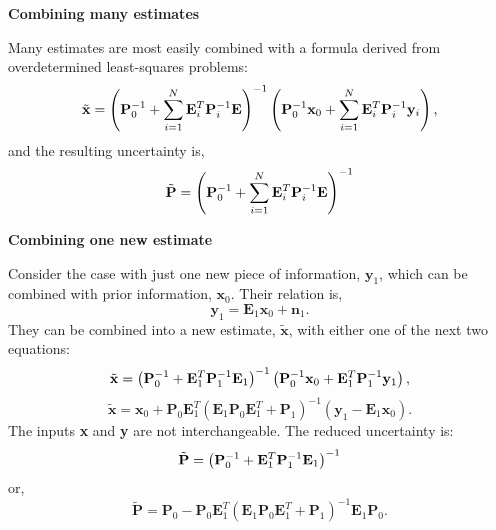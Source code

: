 \documentclass{article}
\begin{document}
\textbf{{Combining many estimates}}

Many estimates are most easily combined with a formula derived from overdetermined least-squares problems:
\begin{equation}
\label{eq:18}
\tilde{\mathbf{x}} = \left({\bf P}^{-1}_0 + \sum_{i=1}^{N} {\bf E}^T_i {\bf P}_i^{-1} {\bf E} \right)^{-1} \left( {\bf P}_0^{-1} {\bf x}_{0} +  \sum_{i=1}^{N} {\bf E}^T_i {\bf P}_i^{-1} {\bf y}_{i} \right),
\end{equation}
and the resulting uncertainty is,
\begin{equation}
  \label{eq:19}
 \tilde{\mathbf{P}}= \left({\bf P}^{-1}_0 + \sum_{i=1}^{N} {\bf E}^T_i {\bf P}_i^{-1} {\bf E} \right)^{-1}
\end{equation}

\textbf{{Combining one new estimate}}

Consider the case with just one new piece of information,
$\mathbf{y}_{1}$, which can be combined with prior information,
$\mathbf{x}_{0}$. Their relation is,
\begin{equation}
\mathbf{y}_1 = \mathbf{E}_1 \mathbf{x}_{0} + \mathbf{n}_1.
\end{equation}
They can be combined into a new estimate,
$\tilde{\mathbf{x}}$, with either one of the next two equations:
\begin{equation}
\tilde{\mathbf{x}} = \left({\bf P}^{-1}_0 + {\bf E}^T_1 {\bf P}_1^{-1} {\bf E}_1 \right)^{-1} \left( {\bf P}_0^{-1} {\bf x}_{0} +  {\bf E}^T_1 {\bf P}_1^{-1} {\bf y}_1 \right),
\end{equation}
\begin{equation}
\label{eq:15}
\tilde{\mathbf{x}} = \mathbf{x}_0 + \mathbf{P}_0 \mathbf{E}^T_1 (\mathbf{E}_1 \mathbf{P}_0 \mathbf{E}^T_1 + \mathbf{P}_1 )^{-1} (\mathbf{y}_1 - \mathbf{E}_1 \mathbf{x}_0) .
\end{equation}
The inputs \textbf{x} and \textbf{y} are not interchangeable. The reduced uncertainty is:
\begin{equation}
 \tilde{\mathbf{P}}= \left({\bf P}^{-1}_0 + {\bf E}^T_1 {\bf P}_1^{-1} {\bf E}_1 \right)^{-1}
\end{equation}
or,
\begin{equation}
\label{eq:16}
\tilde{\mathbf{P}} = \mathbf{P}_0 - \mathbf{P}_0 \mathbf{E}^T_1 (\mathbf{E}_1 \mathbf{P}_0 \mathbf{E}^T_1 + \mathbf{P}_1 )^{-1} \mathbf{E}_1 \mathbf{P}_0.
\end{equation}
\end{document}
